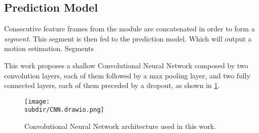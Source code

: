 \subsection{Prediction Model} \label{subsec:prediction-model}

Consecutive feature frames from the  module
are concatenated in order to form a \emph{segment}. This segment is then fed to
the prediction model. Which will output a motion estimation. Segments 

This work proposes a shallow Convolutional Neural Network \cite{FukushimaCNN}
composed by two convolution layers, each of them followed by a max pooling
layer, and two fully connected layers, each of them preceded by a dropout, as
shown in \cref{fig:model-arch-cnn}. 

\begin{figure}
    \centering
    \texttt{[image: \\subdir/CNN.drawio.png]}
    \caption{Convolutional Neural Network architecture used in this work.}
    \label{fig:model-arch-cnn}
\end{figure}






